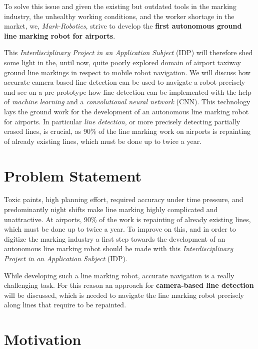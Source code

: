 To solve this issue and given the existing but outdated tools in the marking industry, the unhealthy working conditions, and the worker shortage in the market, we, \emph{Mark-Robotics}, strive to develop the \textbf{first autonomous ground line marking robot for airports}.

This \emph{Interdisciplinary Project in an Application Subject} (IDP) will therefore shed some light in the, until now, quite poorly explored domain of airport taxiway ground line markings in respect to mobile robot navigation. We will discuss how accurate camera-based line detection can be used to navigate a robot precisely and see on a pre-prototype how line detection can be implemented with the help of \emph{machine learning} and a \emph{convolutional neural network} (CNN). This technology lays the ground work for the development of an autonomous line marking robot for airports. In particular \emph{line detection}, or more precisely detecting partially erased lines, is crucial, as 90\% of the line marking work on airports is repainting of already existing lines, which must be done up to twice a year. 

\section{Problem Statement}
\label{sec:introduction-problem-statement}

Toxic paints, high planning effort, required accuracy under time pressure, and predominantly night shifts make line marking highly complicated and unattractive. At airports, 90\% of the work is repainting of already existing lines, which must be done up to twice a year. To improve on this, and in order to digitize the marking industry a first step towards the development of an autonomous line marking robot should be made with this \emph{Interdisciplinary Project in an Application Subject} (IDP).

While developing such a line marking robot, accurate navigation is a really challenging task. For this reason an approach for \textbf{camera-based line detection} will be discussed, which is needed to navigate the line marking robot precisely along lines that require to be repainted.

\newpage

\section{Motivation}
\label{sec:introduction-motivation}

